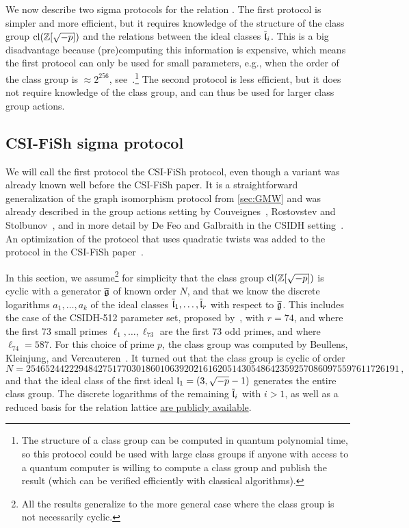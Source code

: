 We now describe two sigma protocols for the relation \R[CSIDH]. The first protocol is simpler and more efficient, but it requires knowledge of the structure of the class group $\text{cl}(\mathbb{Z}[\sqrt{-p}])$ and the relations between the ideal classes $\overline{\mathfrak{l}}_i$. This is a big disadvantage because (pre)computing this information is expensive, which means the first protocol can only be used for small parameters, e.g., when the order of the class group is $\approx 2^{256}$, see~\cite{CSI-FiSh}.\footnote{The structure of a class group can be computed in quantum polynomial time, so this protocol could be used with large class groups if anyone with access to a quantum computer is willing to compute a class group and publish the result (which can be verified efficiently with classical algorithms).} The second protocol is less efficient, but it does not require knowledge of the class group, and can thus be used for larger class group actions.  

\subsection{CSI-FiSh sigma protocol}

We will call the first protocol the CSI-FiSh protocol, even though a variant was already known well before the CSI-FiSh paper. It is a straightforward generalization of the graph isomorphism protocol from \cref{sec:GMW} and was already described in the group actions setting by Couveignes~\cite{Couv06},  Rostovstev and Stolbunov~\cite{RosSto}, and in more detail by De Feo and Galbraith in the CSIDH setting~\cite{SeaSign}. An optimization of the protocol that uses quadratic twists was added to the protocol in the CSI-FiSh paper~\cite{CSI-FiSh}.


In this section, we assume\footnote{All the results generalize to the more general case where the class group is not necessarily cyclic.} for simplicity that the class group $\text{cl}(\mathbb{Z}[\sqrt{-p}])$ is cyclic with a generator $\overline{\mathfrak{g}}$ of known order $N$,  and that we know the discrete logarithms $a_1,\dots,a_k$ of the ideal classes $\overline{\mathfrak{l}}_1,\dots,\overline{\mathfrak{l}}_r$ with respect to $\overline{\mathfrak{g}}$. This includes the case of the CSIDH-512 parameter set, proposed by~\cite{CSIDH}, with $r = 74$, and where the first 73 small primes $\ell_1,\dots,\ell_{73}$ are the first 73 odd primes, and where $\ell_{74} = 587$. For this choice of prime $p$, the class group was computed by Beullens, Kleinjung, and Vercauteren~\cite{CSI-FiSh}. It turned out that the class group is cyclic of order \[N = {\scriptstyle 254652442229484275177030186010639202161620514305486423592570860975597611726191 } \, ,\] and that the ideal class of the first ideal $\mathfrak{l}_1 = (3,\sqrt{-p}-1) $ generates the entire class group. The discrete logarithms of the remaining $\overline{\mathfrak{l}}_i$ with $i > 1$, as well as a reduced basis for the relation lattice  \href{https://github.com/KULeuven-COSIC/CSI-FiSh/tree/master/classgroup_data}{are publicly available}.

